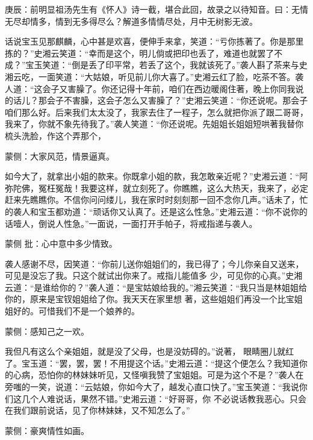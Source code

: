 \begin{parag}
    \begin{note}庚辰：前明显祖汤先生有《怀人》诗一截，堪合此回，故录之以待知音。曰：无情无尽却情多，情到无多得尽么？解道多情情尽处，月中无树影无波。\end{note}
\end{parag}


\begin{parag}
    话说宝玉见那麒麟，心中甚是欢喜，便伸手来拿，笑道：“亏你拣著了。你是那里拣的？”史湘云笑道：“幸而是这个，明儿倘或把印也丢了，难道也就罢了不 成？”宝玉笑道：“倒是丢了印平常，若丢了这个，我就该死了。”袭人斟了茶来与史湘云吃，一面笑道：“大姑娘，听见前儿你大喜了。”史湘云红了脸，吃茶不答。袭人道：“这会子又害臊了。你还记得十年前，咱们在西边暖阁住著，晚上你同我说的话儿？那会子不害臊，这会子怎么又害臊了？”史湘云笑道：“你还说呢。那会子咱们那么好。后来我们太太没了，我家去住了一程子，怎么就把你派了跟二哥哥，我来了，你就不象先待我了。”袭人笑道：“你还说呢。先姐姐长姐姐短哄著我替你梳头洗脸，作这个弄那个，\begin{note}蒙侧：大家风范，情景逼真。\end{note}如今大了，就拿出小姐的款来。你既拿小姐的款，我怎敢亲近呢？”史湘云道：“阿弥陀佛，冤枉冤哉！我要这样，就立刻死了。你瞧瞧，这么大热天，我来了，必定赶来先瞧瞧你。不信你问问缕儿，我在家时时刻刻那一回不念你几声。”话未了，忙的袭人和宝玉都劝道：“顽话你又认真了。还是这么性急。”史湘云道：“你不说你的话噎人，倒说人性急。”一面说，一面打开手帕子，将戒指递与袭人。\begin{note}蒙侧 批：心中意中多少情致。\end{note}袭人感谢不尽，因笑道：“你前儿送你姐姐们的，我已得了；今儿你亲自又送来，可见是没忘了我。只这个就试出你来了。戒指儿能值多 少，可见你的心真。”史湘云道：“是谁给你的？”袭人道：“是宝姑娘给我的。”湘云笑道：“我只当是林姐姐给你的，原来是宝钗姐姐给了你。我天天在家里想 著，这些姐姐们再没一个比宝姐姐好的。可惜我们不是一个娘养的。\begin{note}蒙侧：感知己之一欢。\end{note}我但凡有这么个亲姐姐，就是没了父母，也是没妨碍的。”说著， 眼睛圈儿就红了。宝玉道：“罢，罢，罢！不用提这个话。”史湘云道：“提这个便怎么？我知道你的心病，恐怕你的林妹妹听见，又怪嗔我赞了宝姐姐。可是为这个不是？”袭人在旁嗤的一笑，说道：“云姑娘，你如今大了，越发心直口快了。”宝玉笑道：“我说你们这几个人难说话，果然不错。”史湘云道：“好哥哥，你 不必说话教我恶心。只会在我们跟前说话，见了你林妹妹，又不知怎么了。”\begin{note}蒙侧：豪爽情性如画。\end{note}
\end{parag}


